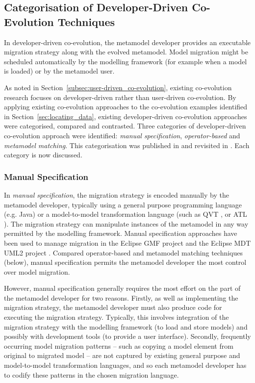 \subsection{Categorisation of Developer-Driven Co-Evolution Techniques}
\label{subsec:co-evolution_categorisation}
In developer-driven co-evolution, the metamodel developer provides an executable migration strategy along with the evolved metamodel. Model migration might be scheduled automatically by the modelling framework (for example when a model is loaded) or by the metamodel user.

As noted in Section~\ref{subsec:user-driven_co-evolution}, existing co-evolution research focuses on developer-driven rather than user-driven co-evolution. By applying existing co-evolution approaches to the co-evolution examples identified in Section~\ref{sec:locating_data}, existing developer-driven co-evolution approaches were categorised, compared and contrasted. Three categories of developer-driven co-evolution approach were identified: \emph{manual specification}, \emph{operator-based} and \emph{metamodel matching}. This categorisation was published in \cite{rose09analysis} and revisited in \cite{rose10flock}. Each category is now discussed.

\subsubsection{Manual Specification}
In \emph{manual specification}, the migration strategy is encoded manually by the metamodel developer, typically using a general purpose programming language (e.g. Java) or a model-to-model transformation language (such as QVT \cite{qvt}, or ATL \cite{jouault05transforming}). The migration strategy can manipulate instances of the metamodel in any way permitted by the modelling framework. Manual specification approaches have been used to manage migration in the Eclipse GMF project \cite{gronback06gmf} and the Eclipse MDT UML2 project \cite{mdt_uml2}. Compared operator-based and metamodel matching techniques (below), manual specification permits the metamodel developer the most control over model migration.

However, manual specification generally requires the most effort on the part of the metamodel developer for two reasons. Firstly, as well as implementing the migration strategy, the metamodel developer must also produce code for executing the migration strategy. Typically, this involves integration of the migration strategy with the modelling framework (to load and store models) and possibly with development tools (to provide a user interface). Secondly, frequently occurring model migration patterns -- such as copying a model element from original to migrated model -- are not captured by existing general purpose and model-to-model transformation languages, and so each metamodel developer has to codify these patterns in the chosen migration language.

